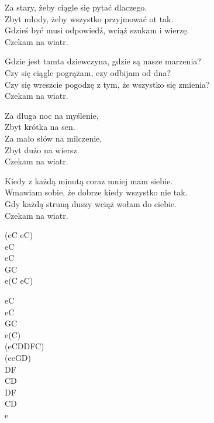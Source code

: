 \begin{text}
\small{
    \hfill\break
Za stary, żeby ciągle się pytać dlaczego.\\
Zbyt młody, żeby wszystko przyjmować ot tak.\\
Gdzieś być musi odpowiedź, wciąż szukam i wierzę.\\
Czekam na wiatr.

Gdzie jest tamta dziewczyna, gdzie są nasze marzenia?\\
Czy się ciągle pogrążam, czy odbijam od dna?\\
Czy się wreszcie pogodzę z tym, że wszystko się zmienia?\\
Czekam na wiatr.

\hfill\break
\vin Za długa noc na myślenie,\\
\vin Zbyt krótka na sen.\\
\vin Za mało słów na milczenie,\\
\vin Zbyt dużo na wiersz.\\
\vin Czekam na wiatr.

Kiedy z każdą minutą coraz mniej mam siebie.\\
Wmawiam sobie, że dobrze kiedy wszystko nie tak.\\
Gdy każdą struną duszy wciąż wołam do ciebie.\\
Czekam na wiatr.}
\end{text}
\begin{chord}
\small{
    (eC eC)\\
    eC\\
    eC\\
    GC\\
    e(C eC)

    eC\\
    eC\\
    GC\\
    e(C)\\
    (eCDDFC)\\
    (eeGD)\\
    DF\\
    CD\\
    DF\\
    CD\\
    e}
\end{chord}